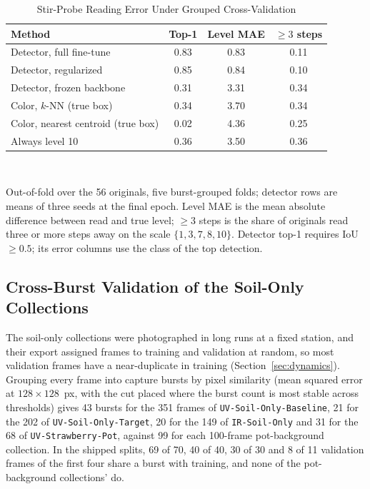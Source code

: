 ﻿\documentclass[journal]{IEEEtran}
\begin{document}
\begin{table}[!t]
\renewcommand{\arraystretch}{1.3}
\caption{Stir-Probe Reading Error Under Grouped Cross-Validation}
\label{tab:stirread}
\centering
\footnotesize
\setlength{\tabcolsep}{3.5pt}
\begin{tabular}{l c c c}
\toprule
\textbf{Method} & \textbf{Top-1} & \textbf{Level MAE} & \textbf{$\geq 3$ steps} \\
\midrule
Detector, full fine-tune & 0.83 & 0.83 & 0.11 \\
Detector, regularized & 0.85 & 0.84 & 0.10 \\
Detector, frozen backbone & 0.31 & 3.31 & 0.34 \\
Color, $k$-NN (true box) & 0.34 & 3.70 & 0.34 \\
Color, nearest centroid (true box) & 0.02 & 4.36 & 0.25 \\
Always level 10 & 0.36 & 3.50 & 0.36 \\
\bottomrule
\end{tabular}
\\[2pt]
\parbox{\columnwidth}{\footnotesize Out-of-fold over the 56 originals, five burst-grouped folds; detector rows are means of three seeds at the final epoch. Level MAE is the mean absolute difference between read and true level; $\geq 3$ steps is the share of originals read three or more steps away on the scale $\{1, 3, 7, 8, 10\}$. Detector top-1 requires IoU~$\geq 0.5$; its error columns use the class of the top detection.}
\end{table}

\subsection{Cross-Burst Validation of the Soil-Only Collections}
\label{sec:burst-cv}
The soil-only collections were photographed in long runs at a fixed station, and their export assigned frames to training and validation at random, so most validation frames have a near-duplicate in training (Section~\ref{sec:dynamics}). Grouping every frame into capture bursts by pixel similarity (mean squared error at $128 \times 128$~px, with the cut placed where the burst count is most stable across thresholds) gives 43 bursts for the 351 frames of \texttt{UV-Soil-Only-Baseline}, 21 for the 202 of \texttt{UV-Soil-Only-Target}, 20 for the 149 of \texttt{IR-Soil-Only} and 31 for the 68 of \texttt{UV-Strawberry-Pot}, against 99 for each 100-frame pot-background collection. In the shipped splits, 69 of 70, 40 of 40, 30 of 30 and 8 of 11 validation frames of the first four share a burst with training, and none of the pot-background collections' do.
\end{document}
